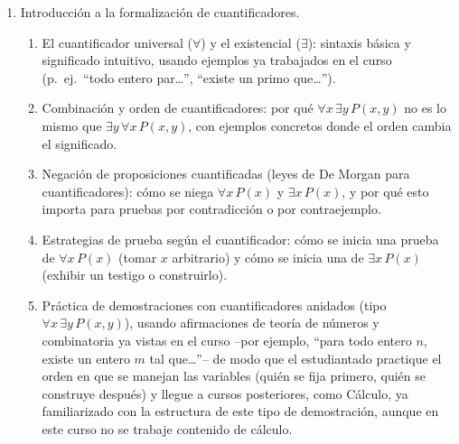 \begin{refsection}
\begin{enumerate}
\item  Introducción a la formalización de cuantificadores.
  \begin{enumerate}
    \item El cuantificador universal ($\forall$) y el existencial
      ($\exists$): sintaxis básica y significado intuitivo, usando
      ejemplos ya trabajados en el curso (p.\ ej.\ ``todo entero
      par\ldots'', ``existe un primo que\ldots'').
    \item Combinación y orden de cuantificadores: por qué
      $\forall x\, \exists y\, P(x,y)$ no es lo mismo que
      $\exists y\, \forall x\, P(x,y)$, con ejemplos concretos donde
      el orden cambia el significado.
    \item Negación de proposiciones cuantificadas (leyes de De Morgan
      para cuantificadores): cómo se niega $\forall x\, P(x)$ y
      $\exists x\, P(x)$, y por qué esto importa para pruebas por
      contradicción o por contraejemplo.
    \item Estrategias de prueba según el cuantificador: cómo se
      inicia una prueba de $\forall x\, P(x)$ (tomar $x$ arbitrario)
      y cómo se inicia una de $\exists x\, P(x)$ (exhibir un testigo
      o construirlo).
    \item Práctica de demostraciones con cuantificadores anidados
      (tipo $\forall x\, \exists y\, P(x,y)$), usando afirmaciones
      de teoría de números y combinatoria ya vistas en el curso
      --por ejemplo, ``para todo entero $n$, existe un entero $m$ tal
      que\ldots''-- de modo que el estudiantado practique el orden en
      que se manejan las variables (quién se fija primero, quién se
      construye después) y llegue a cursos posteriores, como Cálculo,
      ya familiarizado con la estructura de este tipo de
      demostración, aunque en este curso no se trabaje contenido de
      cálculo.
  \end{enumerate}


\end{enumerate}
\end{refsection}

